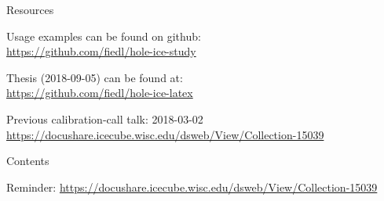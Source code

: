 \begin{frame}{Resources}
  \begin{center}
    Usage examples can be found on github: \\ \vspace{0.2cm}
    \url{https://github.com/fiedl/hole-ice-study}

    \vspace{1cm}

    Thesis (2018-09-05) can be found at: \\ \vspace{0.2cm}
    \url{https://github.com/fiedl/hole-ice-latex}

    \vspace{1cm}

    Previous calibration-call talk: 2018-03-02 \\ \vspace{0.2cm}
    \url{https://docushare.icecube.wisc.edu/dsweb/View/Collection-15039}
  \end{center}
\end{frame}

\begin{frame}{Contents}

  \tableofcontents[subsectionstyle=show]

  Reminder: \url{https://docushare.icecube.wisc.edu/dsweb/View/Collection-15039}

\end{frame}
